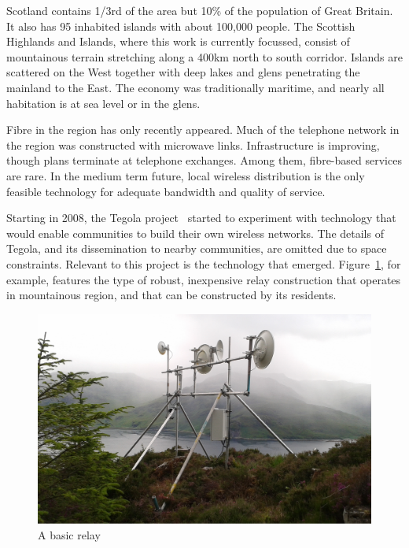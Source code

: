 
Scotland contains 1/3rd of the area but 10\% of the population of Great Britain. It also has 95  inhabited islands with about
 100,000 people. The Scottish Highlands and Islands, where this
work is currently focussed, consist of mountainous terrain stretching along a 400km north to south corridor. Islands are scattered on the West together with
deep lakes and glens penetrating the mainland to the East.  The economy was
traditionally maritime, and nearly all habitation is at sea level or in the
glens.

Fibre in the region has only recently appeared.  Much of the telephone network
in the region was constructed with microwave links. Infrastructure is improving,
though plans terminate at telephone exchanges. Among them, fibre-based
services are rare. In the medium term future, local wireless distribution is the
only feasible technology for adequate bandwidth and quality of service.

Starting in 2008, the Tegola project~\cite{tegola} started to
experiment with technology that would enable communities to build
their own wireless networks.
The details of Tegola, and its dissemination to nearby communities, are
omitted due to space constraints. Relevant to this project is the technology
that emerged. Figure~\ref{fig:mhialairigh}, for example, features the type of
robust, inexpensive relay construction that operates in mountainous region, and
that can be constructed by its residents.

\begin{figure}[h]
\centering
 \includegraphics[width=0.8\columnwidth]{figs/mhialairigh-from-behind}
 \caption{A basic relay}
\label{fig:mhialairigh}
\end{figure}

